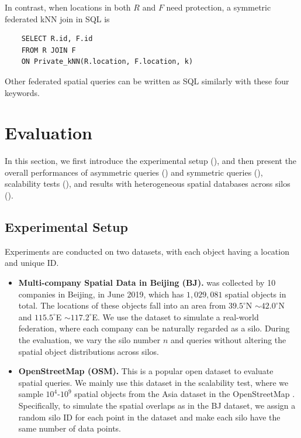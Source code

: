 In contrast, when locations in both $R$ and $F$ need protection, a symmetric federated kNN join in SQL is
\begin{lstlisting}
    SELECT R.id, F.id 
    FROM R JOIN F
    ON Private_kNN(R.location, F.location, k)
\end{lstlisting}
Other federated spatial queries can be written as SQL similarly with these four keywords.

\section{Evaluation}
\label{sec:evaluations}

In this section, we first introduce the experimental setup (), and then present the overall performances of asymmetric queries () and symmetric queries (), scalability  tests (), and results with heterogeneous spatial databases across silos ().

\subsection{Experimental Setup}
\label{sec:experiment-setup}

Experiments are conducted on two datasets, with each object having a location and unique ID.

\begin{itemize}
    \item \textbf{Multi-company Spatial Data in Beijing (BJ).}
     was collected by 10 companies in Beijing, in June 2019, which has $1,029,081$ spatial objects in total.
    The locations of these objects fall into an area from $39.5^{\circ}$N $\sim42.0^{\circ}$N and $115.5^{\circ}$E $\sim117.2^{\circ}$E.
    We use the dataset to simulate a real-world federation, where each company can be naturally regarded as a silo.
    During the evaluation, we vary the silo number $n$ and queries without altering the spatial object distributions across silos.

    \item \textbf{OpenStreetMap (OSM).}
    This is a popular open dataset to evaluate spatial queries.
    We mainly use this dataset in the scalability test, where we sample $10^4$-$10^9$ spatial objects from the Asia dataset in the OpenStreetMap \cite{osm}.
    Specifically, to simulate the spatial overlaps as in the BJ dataset, we assign a random silo ID for each point in the dataset and make each silo have the same number of data points.
\end{itemize}

